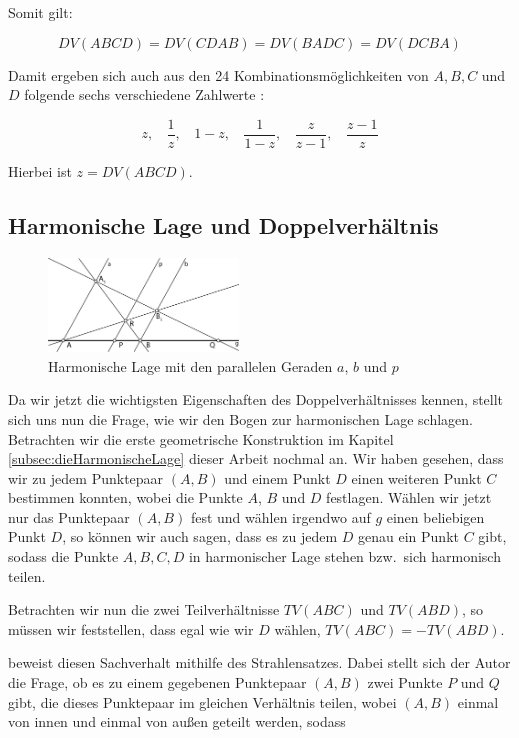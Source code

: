 \documentclass[12pt,a4paper]{article}
\begin{document}
Somit gilt:

\[DV(A B C D) = DV(C D A B) = DV(B A D C) = DV(D C B A)\]

Damit ergeben sich auch aus den 24 Kombinationsmöglichkeiten von $A, B, C$ und $D$ folgende sechs verschiedene Zahlwerte \citep[s.][S.~77f]{projektiveGeometrie}:

\[z, ~~~~\dfrac{1}{z}, ~~~~1-z, ~~~~\dfrac{1}{1-z}, ~~~~\dfrac{z}{z-1}, ~~~~\dfrac{z-1}{z}\]

Hierbei ist $z = DV(A B C D)$.

\subsection{Harmonische Lage und Doppelverhältnis}

\begin{figure}
\hspace{-0.025\textwidth}
\includegraphics[width=0.45\textwidth]{Bilder/doppelverhaeltnis.png}
\caption{Harmonische Lage mit den parallelen Geraden $a$, $b$ und $p$}
\label{fig:harmonDoppel}
\end{figure}

Da wir jetzt die wichtigsten Eigenschaften des Doppelverhältnisses kennen, stellt sich uns nun die Frage, wie wir den Bogen zur harmonischen Lage schlagen. Betrachten wir die erste geometrische Konstruktion im Kapitel \ref{subsec:dieHarmonischeLage} dieser Arbeit nochmal an. Wir haben gesehen, dass wir zu jedem Punktepaar $(A, B)$ und einem Punkt $D$ einen weiteren Punkt $C$ bestimmen konnten, wobei die Punkte $A$, $B$ und $D$ festlagen. Wählen wir jetzt nur das Punktepaar $(A, B)$ fest und wählen irgendwo auf $g$ einen beliebigen Punkt $D$, so können wir auch sagen, dass es zu jedem $D$ genau ein Punkt $C$ gibt, sodass die Punkte $A, B, C, D$ in harmonischer Lage stehen bzw.~sich harmonisch teilen.

Betrachten wir nun die zwei Teilverhältnisse $TV(A B C)$ und $TV(A B D)$, so müssen wir feststellen, dass egal wie wir $D$ wählen, $TV(A B C) = -TV(A B D)$.

\citep{projektiveGeometrie} beweist diesen Sachverhalt mithilfe des Strahlensatzes. Dabei stellt sich der Autor die Frage, ob es zu einem gegebenen Punktepaar $(A, B)$ zwei Punkte $P$ und $Q$ gibt, die dieses Punktepaar im gleichen Verhältnis teilen, wobei $(A,  B)$ einmal von innen und einmal von außen geteilt werden, sodass
\end{document}
